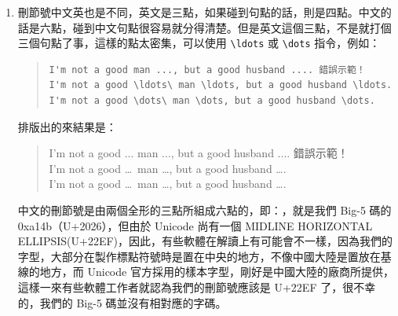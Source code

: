 \begin{enumerate}
         排版出來的結果將會是（差異不明顯，請小心比較）：

         \begin{quote}
            Please see Appendix A. We will be there soon.\\
            Please see Appendix A\null. We will be there soon.
         \end{quote}

         如果，你現在閱讀的是 HTML 格式文件，有些例子如果無法明顯顯示出來，請改閱覽 PDF 版本。而且，如果你製作 PDF 格式時，字型沒有內嵌（本文的英數字是嵌入 Computer Modern Type1 字型），差異可能將會更不明顯。可試著使用 {\sffamily gv/gsview} 去閱覽，然後調整成 Landscape，把句子尾部拉到邊緣的地方去就看得出來了。這在句子多的時候，這個空白也並非固定大小的，\LaTeX{} 會視文章結構的需要做細微的調整。

   \item 刪節號中文英也是不同，英文是三點，如果碰到句點的話，則是四點。中文的話是六點，碰到中文句點很容易就分得清楚。但是英文這個三點，不是就打個三個句點了事，這樣的點太密集，可以使用 \verb|\ldots| 或 \verb|\dots| 指令，例如：

         \begin{quote}
            \begin{verbatim}
I'm not a good man ..., but a good husband .... 錯誤示範！
I'm not a good \ldots\ man \ldots, but a good husband \ldots.
I'm not a good \dots\ man \dots, but a good husband \dots.
\end{verbatim}
         \end{quote}

         排版出的來結果是：

         \begin{quote}
            I'm not a good ... man ..., but a good husband .... 錯誤示範！\\
            I'm not a good \ldots\ man \ldots, but a good husband \ldots.\\
            I'm not a good \dots\ man \dots, but a good husband \ldots.
         \end{quote}

         中文的刪節號是由兩個全形的三點所組成六點的，即：\chdots{}，就是我們 Big-5 碼的 {\ttfamily 0xa14b}（{\ttfamily U+2026}），但由於 Unicode 尚有一個 MIDLINE HORIZONTAL ELLIPSIS({\ttfamily U+22EF})，因此，有些軟體在解讀上有可能會不一樣，因為我們的字型，大部分在製作標點符號時是置在中央的地方，不像中國大陸是置放在基線的地方，而 Unicode 官方採用的樣本字型，剛好是中國大陸的廠商所提供，這樣一來有些軟體工作者就認為我們的刪節號應該是 {\ttfamily U+22EF} 了，很不幸的，我們的 Big-5 碼並沒有相對應的字碼。


\end{enumerate}
